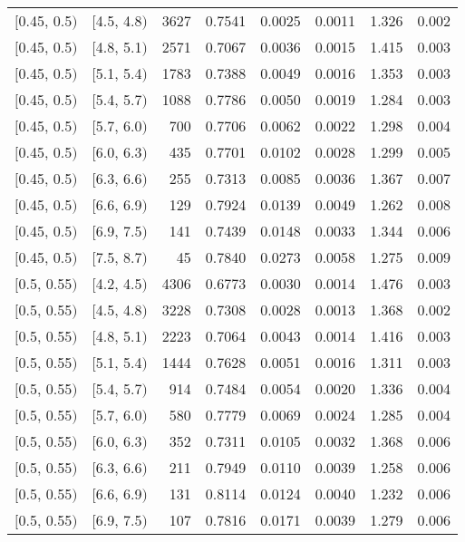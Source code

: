 \begin{longtable}{| l | l | r | r | r | r | r | r |}
        $[$0.45, 0.5$)$ & $[$4.5, 4.8$)$ & 3627 & 0.7541 & 0.0025 & 0.0011 & 1.326 & 0.002 \\
        $[$0.45, 0.5$)$ & $[$4.8, 5.1$)$ & 2571 & 0.7067 & 0.0036 & 0.0015 & 1.415 & 0.003 \\
        $[$0.45, 0.5$)$ & $[$5.1, 5.4$)$ & 1783 & 0.7388 & 0.0049 & 0.0016 & 1.353 & 0.003 \\
        $[$0.45, 0.5$)$ & $[$5.4, 5.7$)$ & 1088 & 0.7786 & 0.0050 & 0.0019 & 1.284 & 0.003 \\
        $[$0.45, 0.5$)$ & $[$5.7, 6.0$)$ & 700 & 0.7706 & 0.0062 & 0.0022 & 1.298 & 0.004 \\
        $[$0.45, 0.5$)$ & $[$6.0, 6.3$)$ & 435 & 0.7701 & 0.0102 & 0.0028 & 1.299 & 0.005 \\
        $[$0.45, 0.5$)$ & $[$6.3, 6.6$)$ & 255 & 0.7313 & 0.0085 & 0.0036 & 1.367 & 0.007 \\
        $[$0.45, 0.5$)$ & $[$6.6, 6.9$)$ & 129 & 0.7924 & 0.0139 & 0.0049 & 1.262 & 0.008 \\
        $[$0.45, 0.5$)$ & $[$6.9, 7.5$)$ & 141 & 0.7439 & 0.0148 & 0.0033 & 1.344 & 0.006 \\
        $[$0.45, 0.5$)$ & $[$7.5, 8.7$)$ & 45 & 0.7840 & 0.0273 & 0.0058 & 1.275 & 0.009 \\
        $[$0.5, 0.55$)$ & $[$4.2, 4.5$)$ & 4306 & 0.6773 & 0.0030 & 0.0014 & 1.476 & 0.003 \\
        $[$0.5, 0.55$)$ & $[$4.5, 4.8$)$ & 3228 & 0.7308 & 0.0028 & 0.0013 & 1.368 & 0.002 \\
        $[$0.5, 0.55$)$ & $[$4.8, 5.1$)$ & 2223 & 0.7064 & 0.0043 & 0.0014 & 1.416 & 0.003 \\
        $[$0.5, 0.55$)$ & $[$5.1, 5.4$)$ & 1444 & 0.7628 & 0.0051 & 0.0016 & 1.311 & 0.003 \\
        $[$0.5, 0.55$)$ & $[$5.4, 5.7$)$ & 914 & 0.7484 & 0.0054 & 0.0020 & 1.336 & 0.004 \\
        $[$0.5, 0.55$)$ & $[$5.7, 6.0$)$ & 580 & 0.7779 & 0.0069 & 0.0024 & 1.285 & 0.004 \\
        $[$0.5, 0.55$)$ & $[$6.0, 6.3$)$ & 352 & 0.7311 & 0.0105 & 0.0032 & 1.368 & 0.006 \\
        $[$0.5, 0.55$)$ & $[$6.3, 6.6$)$ & 211 & 0.7949 & 0.0110 & 0.0039 & 1.258 & 0.006 \\
        $[$0.5, 0.55$)$ & $[$6.6, 6.9$)$ & 131 & 0.8114 & 0.0124 & 0.0040 & 1.232 & 0.006 \\
        $[$0.5, 0.55$)$ & $[$6.9, 7.5$)$ & 107 & 0.7816 & 0.0171 & 0.0039 & 1.279 & 0.006 \\

\end{longtable}
